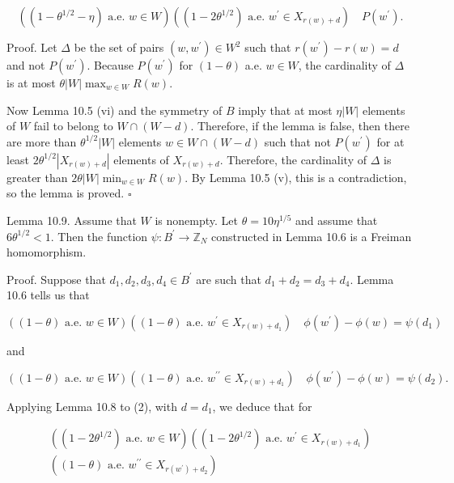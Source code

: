 \documentclass[10pt]{article}
\begin{document}
$$
\left(\left(1-\theta^{1 / 2}-\eta\right) \text { a.e. } w \in W\right)\left(\left(1-2 \theta^{1 / 2}\right) \text { a.e. } w^{\prime} \in X_{r(w)+d}\right) \quad P\left(w^{\prime}\right) .
$$

Proof. Let $\Delta$ be the set of pairs $\left(w, w^{\prime}\right) \in W^{2}$ such that $r\left(w^{\prime}\right)-r(w)=d$ and not $P\left(w^{\prime}\right)$. Because $P\left(w^{\prime}\right)$ for $(1-\theta)$ a.e. $w \in W$, the cardinality of $\Delta$ is at most $\theta|W| \max _{w \in W} R(w)$.

Now Lemma 10.5 (vi) and the symmetry of $B$ imply that at most $\eta|W|$ elements of $W$ fail to belong to $W \cap(W-d)$. Therefore, if the lemma is false, then there are more than $\theta^{1 / 2}|W|$ elements $w \in W \cap(W-d)$ such that not $P\left(w^{\prime}\right)$ for at least $2 \theta^{1 / 2}\left|X_{r(w)+d}\right|$ elements of $X_{r(w)+d}$. Therefore, the cardinality of $\Delta$ is greater than $2 \theta|W| \min _{w \in W} R(w)$. By Lemma 10.5 (v), this is a contradiction, so the lemma is proved. \(\square\)

Lemma 10.9. Assume that $W$ is nonempty. Let $\theta=10 \eta^{1 / 5}$ and assume that $6 \theta^{1 / 2}<1$. Then the function $\psi: B^{\prime} \rightarrow \mathbb{Z}_{N}$ constructed in Lemma 10.6 is a Freiman homomorphism.

Proof. Suppose that $d_{1}, d_{2}, d_{3}, d_{4} \in B^{\prime}$ are such that $d_{1}+d_{2}=d_{3}+d_{4}$. Lemma 10.6 tells us that


\begin{equation*}
((1-\theta) \text { a.e. } w \in W)\left((1-\theta) \text { a.e. } w^{\prime} \in X_{r(w)+d_{1}}\right) \quad \phi\left(w^{\prime}\right)-\phi(w)=\psi\left(d_{1}\right) \tag{1}
\end{equation*}


and


\begin{equation*}
((1-\theta) \text { a.e. } w \in W)\left((1-\theta) \text { a.e. } w^{\prime \prime} \in X_{r(w)+d_{1}}\right) \quad \phi\left(w^{\prime}\right)-\phi(w)=\psi\left(d_{2}\right) \text {. } \tag{2}
\end{equation*}


Applying Lemma 10.8 to (2), with $d=d_{1}$, we deduce that for

$$
\begin{gathered}
\left(\left(1-2 \theta^{1 / 2}\right) \text { a.e. } w \in W\right)\left(\left(1-2 \theta^{1 / 2}\right) \text { a.e. } w^{\prime} \in X_{r(w)+d_{1}}\right) \\
\left((1-\theta) \text { a.e. } w^{\prime \prime} \in X_{r\left(w^{\prime}\right)+d_{2}}\right)
\end{gathered}
$$
\end{document}

